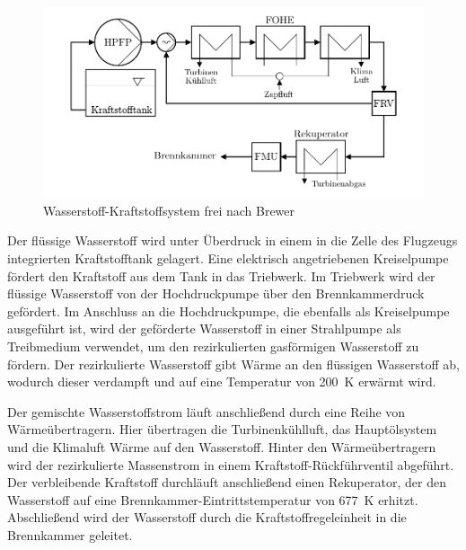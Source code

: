 \begin{figure}[ht]
\centering
\includegraphics[width=1\linewidth]{4_Abbildungen/2_Hauptteil/Kraftstoffsystem Abbildungen/brewer.pdf}
  \caption{Wasserstoff-Kraftstoffsystem frei nach Brewer \cite{Brewer.1991}}
  \label{fig:brewer}
\end{figure}
\FloatBarrier 

Der flüssige Wasserstoff wird unter Überdruck in einem in die Zelle des Flugzeugs integrierten Kraftstofftank  gelagert. Eine elektrisch angetriebenen Kreiselpumpe fördert den Kraftstoff aus dem Tank in das Triebwerk. Im Triebwerk wird der flüssige Wasserstoff von der Hochdruckpumpe über den Brennkammerdruck gefördert. Im Anschluss an die Hochdruckpumpe, die ebenfalls als Kreiselpumpe ausgeführt ist, wird der geförderte Wasserstoff in einer Strahlpumpe als Treibmedium verwendet, um den rezirkulierten gasförmigen Wasserstoff zu fördern. Der rezirkulierte Wasserstoff gibt Wärme an den flüssigen Wasserstoff ab, wodurch dieser verdampft und auf eine Temperatur von \SI{200}{K} erwärmt wird. 

Der gemischte Wasserstoffstrom läuft anschließend durch eine Reihe von Wärmeübertragern. Hier übertragen die Turbinenkühlluft, das Hauptölsystem und die Klimaluft Wärme auf den Wasserstoff. Hinter den Wärmeübertragern wird der rezirkulierte Massenstrom in einem Kraftstoff-Rückführventil abgeführt. Der verbleibende Kraftstoff durchläuft anschließend einen Rekuperator, der den Wasserstoff auf eine Brennkammer-Eintrittstemperatur von \SI{677}{K} erhitzt. Abschließend wird der Wasserstoff durch die Kraftstoffregeleinheit in die Brennkammer geleitet.